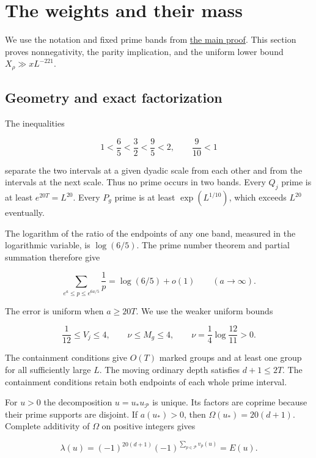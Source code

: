 \hypertarget{weights}{%
\section{The weights and their mass}\label{weights}}

We use the notation and fixed prime bands from
\protect\hyperlink{proof}{the main proof}. This section proves
nonnegativity, the parity implication, and the uniform lower bound
\(X_\rho\gg xL^{-221}\).


\hypertarget{weights-geometry-and-exact-factorization}{%
\subsection{Geometry and exact
factorization}\label{weights-geometry-and-exact-factorization}}

The inequalities

\[
1<\frac65<\frac32<\frac95<2,\qquad\frac9{10}<1
\]

separate the two intervals at a given dyadic scale from each other and
from the intervals at the next scale. Thus no prime occurs in two bands.
Every \(Q_j\) prime is at least \(e^{20T}=L^{20}\). Every \(P_g\) prime
is at least \(\exp(L^{1/10})\), which exceeds \(L^{20}\) eventually.

The logarithm of the ratio of the endpoints of any one band, measured in
the logarithmic variable, is \(\log(6/5)\). The prime number theorem and
partial summation therefore give

\[
\sum_{e^a\le p\le e^{6a/5}}\frac1p
  =\log(6/5)+o(1)\qquad(a\to\infty).
\]

The error is uniform when \(a\ge20T\). We use the weaker uniform bounds

\[
\frac1{12}\le V_j\le4,\qquad \nu\le M_g\le4,
\qquad \nu=\frac14\log\frac{12}{11}>0.
\]

The containment conditions give \(O(T)\) marked groups and at least one
group for all sufficiently large \(L\). The moving ordinary depth
satisfies \(d+1\le2T\). The containment conditions retain both endpoints
of each whole prime interval.

For \(u>0\) the decomposition \(u=u_*u_{\mathcal P}\) is unique. Its
factors are coprime because their prime supports are disjoint. If
\(a(u_*)>0\), then \(\Omega(u_*)=20(d+1)\). Complete additivity of
\(\Omega\) on positive integers gives

\[
\lambda(u)=(-1)^{20(d+1)}
 (-1)^{\sum_{p\in\mathcal P}v_p(u)}=E(u).
\]

